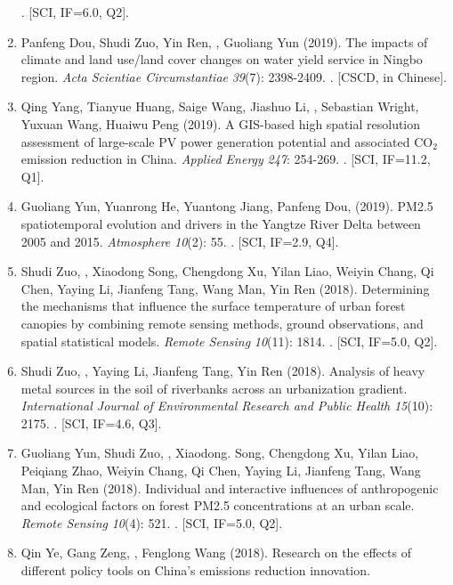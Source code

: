 \begin{enumerate}
    . [SCI, IF=6.0, Q2].
\item
    Panfeng Dou, Shudi Zuo, Yin Ren, \Shaoqing, Guoliang Yun (2019).
    The impacts of climate and land use/land cover changes on water yield service in Ningbo region.
    \textit{Acta Scientiae Circumstantiae} \textit{39}(7): 2398-2409.
    . [CSCD, in Chinese].
\item
    Qing Yang, Tianyue Huang, Saige Wang, Jiashuo Li, \Shaoqing, Sebastian Wright, Yuxuan Wang, Huaiwu Peng (2019).
    A GIS-based high spatial resolution assessment of large-scale PV power generation potential and associated CO$_2$ emission reduction in China.
    \textit{Applied Energy} \textit{247}: 254-269.
    . [SCI, IF=11.2, Q1].
\item
    Guoliang Yun, Yuanrong He, Yuantong Jiang, Panfeng Dou, \Shaoqing \enspace (2019).
    PM2.5 spatiotemporal evolution and drivers in the Yangtze River Delta between 2005 and 2015.
    \textit{Atmosphere} \textit{10}(2): 55.
    . [SCI, IF=2.9, Q4].
\item
    Shudi Zuo, \Shaoqing, Xiaodong Song, Chengdong Xu, Yilan Liao, Weiyin Chang, Qi Chen, Yaying Li, Jianfeng Tang, Wang Man, Yin Ren (2018).
    Determining the mechanisms that influence the surface temperature of urban forest canopies by combining remote sensing methods, ground observations, and spatial statistical models. 
    \textit{Remote Sensing} \textit{10}(11): 1814.
    . [SCI, IF=5.0, Q2].
\item
    Shudi Zuo, \Shaoqing, Yaying Li, Jianfeng Tang, Yin Ren (2018).
	Analysis of heavy metal sources in the soil of riverbanks across an urbanization gradient.
    \textit{International Journal of Environmental Research and Public Health} \textit{15}(10): 2175.
    . [SCI, IF=4.6, Q3].
\item
    Guoliang Yun, Shudi Zuo, \Shaoqing, Xiaodong. Song, Chengdong Xu, Yilan Liao, Peiqiang Zhao, Weiyin Chang, Qi Chen, Yaying Li, Jianfeng Tang, Wang Man, Yin Ren (2018).
	Individual and interactive influences of anthropogenic and ecological factors on forest PM2.5 concentrations at an urban scale.
    \textit{Remote Sensing} \textit{10}(4): 521.
    . [SCI, IF=5.0, Q2].
\item
    Qin Ye, Gang Zeng, \Shaoqing, Fenglong Wang (2018).
	Research on the effects of different policy tools on China’s emissions reduction innovation.

\end{enumerate}
